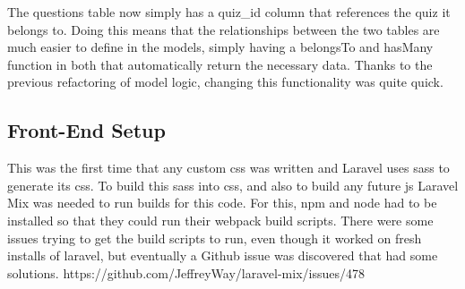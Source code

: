\documentclass{article}
\begin{document}
The questions table now simply has a quiz\_id column that references the quiz it belongs to. Doing this means that the relationships between the two tables are much easier to define in the models, simply having a belongsTo and hasMany function in both that automatically return the necessary data. Thanks to the previous refactoring of model logic, changing this functionality was quite quick.
\subsection{Front-End Setup}
This was the first time that any custom css was written and Laravel uses sass to generate its css. To build this sass into css, and also to build any future js Laravel Mix was needed to run builds for this code. For this, npm and node had to be installed so that they could run their webpack build scripts. There were some issues trying to get the build scripts to run, even though it worked on fresh installs of laravel, but eventually a Github issue was discovered that had some solutions.
https://github.com/JeffreyWay/laravel-mix/issues/478

%
%
\end{document}
